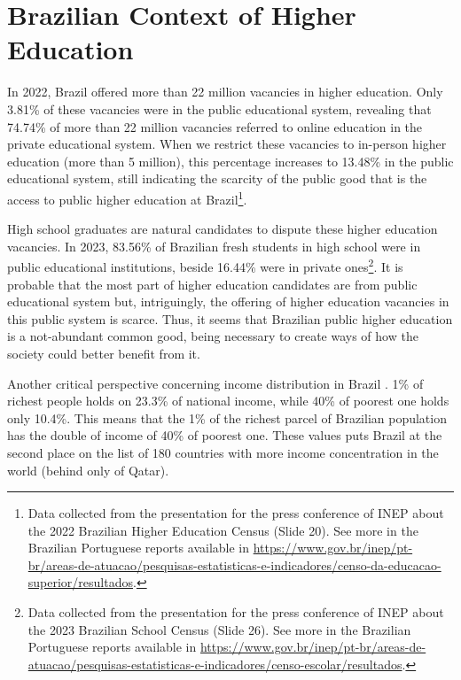 \section{Brazilian Context of Higher Education}
\label{equity-sec:br-context}

In 2022, Brazil offered more than 22 million vacancies in higher education. Only 3.81\% of these vacancies were in the public educational system, revealing that 74.74\% of more than 22 million vacancies referred to online education in the private educational system. When we restrict these vacancies to in-person higher education (more than 5 million), this percentage increases to 13.48\% in the public educational system, still indicating the scarcity of the public good that is the access to public higher education at Brazil\footnote{Data collected from the presentation for the press conference of \gls{INEP} about the 2022 Brazilian Higher Education Census (Slide 20). See more in the Brazilian Portuguese reports available in \url{https://www.gov.br/inep/pt-br/areas-de-atuacao/pesquisas-estatisticas-e-indicadores/censo-da-educacao-superior/resultados}.}.

High school graduates are natural candidates to dispute these higher education vacancies. In 2023, 83.56\% of Brazilian fresh students in high school were in public educational institutions, beside 16.44\% were in private ones\footnote{Data collected from the presentation for the press conference of \gls{INEP} about the 2023 Brazilian School Census (Slide 26). See more in the Brazilian Portuguese reports available in \url{https://www.gov.br/inep/pt-br/areas-de-atuacao/pesquisas-estatisticas-e-indicadores/censo-escolar/resultados}.}. It is probable that the most part of higher education candidates are from public educational system but, intriguingly, the offering of higher education vacancies in this public system is scarce. Thus, it seems that Brazilian public higher education is a not-abundant common good, being necessary to create ways of how the society could better benefit from it.

Another critical perspective concerning income distribution in Brazil \cite{sasse:2021}. 1\% of richest people holds on 23.3\% of national income, while 40\% of poorest one holds only 10.4\%. This means that the 1\% of  the richest parcel of Brazilian population has the double of income of 40\% of poorest one. These values puts Brazil at the second place on the list of 180 countries with more income concentration in the world (behind only of Qatar).

